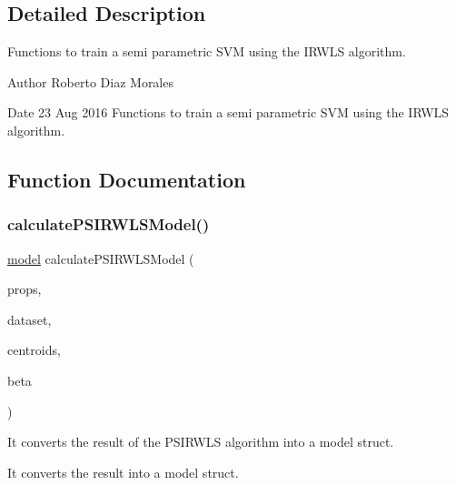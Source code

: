 \subsection{Detailed Description}
Functions to train a semi parametric S\+VM using the I\+R\+W\+LS algorithm. 

\begin{DoxyAuthor}{Author}
Roberto Diaz Morales 
\end{DoxyAuthor}
\begin{DoxyDate}{Date}
23 Aug 2016 Functions to train a semi parametric S\+VM using the I\+R\+W\+LS algorithm. 
\end{DoxyDate}


\subsection{Function Documentation}
\hypertarget{PSIRWLS-train_8h_a71b4329438bbf3210414315619f7b804}{}\label{PSIRWLS-train_8h_a71b4329438bbf3210414315619f7b804} 
\subsubsection{\texorpdfstring{calculate\+P\+S\+I\+R\+W\+L\+S\+Model()}{calculatePSIRWLSModel()}}
{\ttfamily \hyperlink{structmodel}{model} calculate\+P\+S\+I\+R\+W\+L\+S\+Model (\begin{DoxyParamCaption}\item[{\hyperlink{structproperties}{properties}}]{props,  }\item[{\hyperlink{structsvm__dataset}{svm\+\_\+dataset}}]{dataset,  }\item[{int $\ast$}]{centroids,  }\item[{double $\ast$}]{beta }\end{DoxyParamCaption})}



It converts the result of the P\+S\+I\+R\+W\+LS algorithm into a model struct. 

It converts the result into a model struct.


